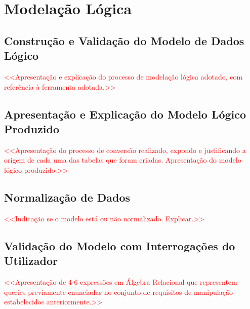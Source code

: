 \documentclass[a4paper,12pt]{scrreprt}
\begin{document}


\chapter{Modelação Lógica}
    \section{Construção e Validação do Modelo de Dados Lógico}
        \textcolor{red}{
            <<Apresentação e explicação do processo de modelação lógica adotado, com referência à ferramenta adotada.>>
        }
    \section{Apresentação e Explicação do Modelo Lógico Produzido}
        \textcolor{red}{
            <<Apresentação do processo de conversão realizado, expondo e justificando a origem de cada uma das tabelas que foram criadas. Apresentação do modelo lógico produzido.>>
        }
    \section{Normalização de Dados}
        \textcolor{red}{
            <<Indicação se o modelo está ou não normalizado. Explicar.>>
        }
    \section{Validação do Modelo com Interrogações do Utilizador}
        \textcolor{red}{
            <<Apresentação de 4-6 expressões em Álgebra Relacional que representem queries previamente enunciadas no conjunto de requisitos de manipulação estabelecidos anteriormente.>>
        }


\end{document}
